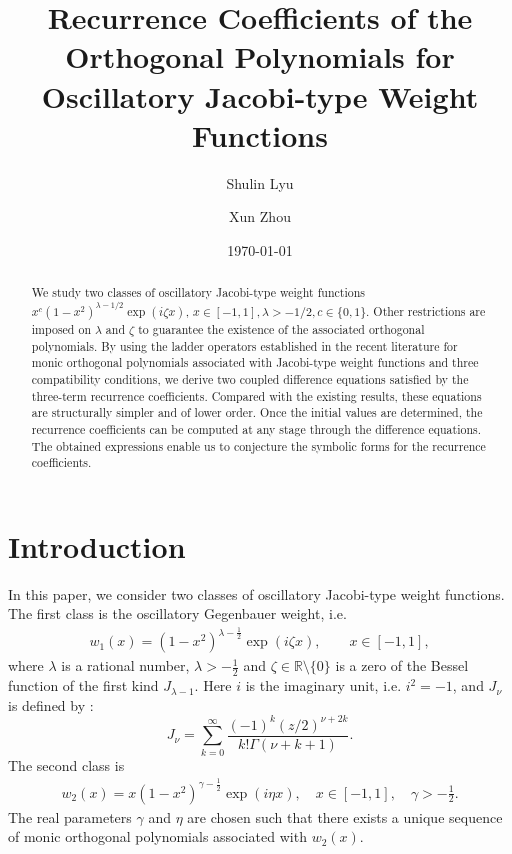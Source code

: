 \documentclass[11pt,a4paper]{article}
\numberwithin{equation}{section}
\begin{document}
\title{Recurrence Coefficients of the Orthogonal Polynomials for Oscillatory Jacobi-type Weight Functions}

\author[1,*]{Shulin Lyu}
\author[1,$\dag$]{Xun Zhou}  %
\date{\today}
\maketitle

\begin{abstract}
\sloppy
We study two classes of oscillatory Jacobi-type weight functions $x^c(1-x^2)^{\lambda-1/2}\exp(i\zeta x)$, $x\in[-1,1], \lambda>-1/2, c\in\{0,1\}$. Other restrictions are imposed on $\lambda$ and $\zeta$ to guarantee the existence of the associated orthogonal polynomials. By using the ladder operators established in the recent literature for monic orthogonal polynomials associated with Jacobi-type weight functions and three compatibility conditions, we derive two coupled difference equations satisfied by the three-term recurrence coefficients. Compared with the existing results, these equations are structurally simpler and of lower order. Once the initial values are determined, the recurrence coefficients can be computed at any stage through the difference equations. The obtained expressions enable us to conjecture the symbolic forms for the recurrence coefficients.
\end{abstract}




\section{Introduction}
In this paper, we consider two classes of oscillatory Jacobi-type weight functions. The first class is the oscillatory Gegenbauer weight, i.e.
\begin{align}\label{w1}
w_1(x)=(1-x^2)^{\lambda-\frac{1}{2}}\exp(i\zeta x), \qquad x\in[-1,1],
\end{align}
where $\lambda$ is a rational number, $\lambda>-\frac{1}{2}$ and $\zeta\in\mathbb{R}\setminus\{0\}$ is a zero of the Bessel function of the first kind $J_{\lambda-1}$. Here $i$ is the imaginary unit, i.e. $i^2=-1$, and $J_{\nu}$ is defined by \cite[p. 102]{Lebedev}:
\[J_{\nu}=\sum_{k=0}^{\infty}\frac{(-1)^k(z/2)^{\nu+2k}}{k!\Gamma(\nu+k+1)}.\]
The second class is
\begin{align}\label{w2}
w_2(x) = x(1-x^{2})^{\gamma-\frac{1}{2}} \exp(\mathit{i}\eta x) ,	 \quad x\in[-1,1] ,\quad \gamma >-\frac{1}{2}.
\end{align}
The real parameters $\gamma$ and $\eta$ are chosen such that there exists a unique sequence of monic orthogonal polynomials associated with $w_2(x)$.
\end{document}
